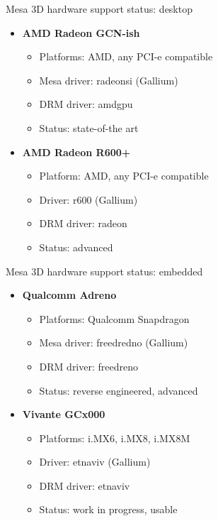 \begin{frame}{Mesa 3D hardware support status: desktop}
  \begin{itemize}
  \item \textbf{AMD Radeon GCN-ish}
    \begin{itemize}
    \item Platforms: AMD, any PCI-e compatible
    \item Mesa driver: radeonsi (Gallium)
    \item DRM driver: amdgpu
    \item Status: state-of-the art
    \end{itemize}
  \item \textbf{AMD Radeon R600+}
    \begin{itemize}
    \item Platform: AMD, any PCI-e compatible
    \item Driver: r600 (Gallium)
    \item DRM driver: radeon
    \item Status: advanced
    \end{itemize}
  \end{itemize}
\end{frame}

\begin{frame}{Mesa 3D hardware support status: embedded}
  \begin{itemize}
  \item \textbf{Qualcomm Adreno}
    \begin{itemize}
    \item Platforms: Qualcomm Snapdragon
    \item Mesa driver: freedredno (Gallium)
    \item DRM driver: freedreno
    \item Status: reverse engineered, advanced
    \end{itemize}
  \item \textbf{Vivante GCx000}
    \begin{itemize}
    \item Platforms: i.MX6, i.MX8, i.MX8M
    \item Driver: etnaviv (Gallium)
    \item DRM driver: etnaviv
    \item Status: work in progress, usable
    \end{itemize}
  \end{itemize}
\end{frame}

